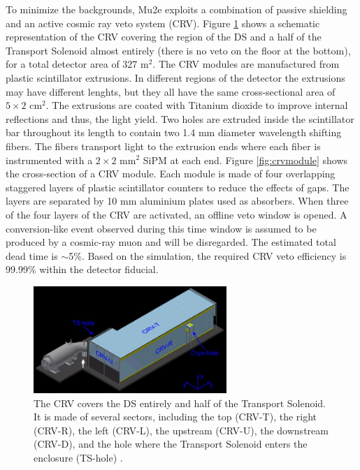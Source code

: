 To minimize the backgrounds, Mu2e exploits a combination of passive shielding and an active 
cosmic ray veto system (CRV). Figure \ref{fig:crv} shows a 
schematic representation of 
the CRV covering the region of the DS and a half of the Transport Solenoid 
almost entirely (there is no veto on the floor at the bottom), for a total detector area
of 327 m$^2$.
The CRV modules are manufactured from plastic scintillator extrusions. 
In different regions of the detector the extrusions may have different lenghts, 
but they all have the same cross-sectional area of $5 \times 2$ cm$^2$.
The extrusions are coated with Titanium dioxide to improve internal reflections and thus, the light yield. 
Two holes are extruded inside the scintillator bar throughout its length to contain two 
1.4 mm diameter wavelength shifting fibers. The fibers transport light to the extrusion 
ends where each fiber is instrumented with a $2 \times 2$ mm$^2$ SiPM at each end. Figure \ref{fig:crvmodule} 
shows the cross-section of a CRV module. Each module is made of four overlapping staggered layers 
of plastic scintillator counters to reduce the effects of gaps. The 
layers are separated by 10 mm aluminium plates used as absorbers. 
When three of the four layers of the CRV are activated, an offline veto window is opened.
A conversion-like event observed during this time window is assumed to be produced by a cosmic-ray muon
and will be disregarded. 
The estimated total dead time is $\sim$5\%.
Based on the simulation, the required CRV veto efficiency is 99.99\% within the detector fiducial.

\begin{figure}[!h]
\centering
\includegraphics[width =0.65\textwidth]{figures/jpg/Crv_downstream.jpg}
\caption[The CRV features and components.]{The CRV covers the DS entirely and half 
of the Transport Solenoid. It is made of several sectors, including the top 
(CRV-T), the right (CRV-R), the left (CRV-L), the upstream (CRV-U), the downstream 
(CRV-D), and the hole where the Transport Solenoid enters the enclosure (TS-hole) \cite{bartoszek2015mu2e}.}
\label{fig:crv}
\end{figure}

